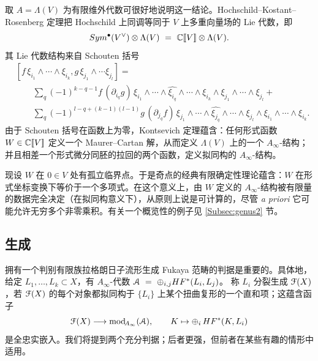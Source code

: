 取 $A = \Lambda(V)$ 为有限维外代数可很好地说明这一结论。Hochschild--Kostant--Rosenberg 定理把 Hochschild 上同调等同于 $V$ 上多重向量场的 Lie 代数，即
\[
Sym^{\bullet}(V^{\vee}) \otimes \Lambda(V) \ = \ \bC[\![V]\!] \otimes \Lambda(V).
\]
其 Lie 代数结构来自 Schouten 括号
\begin{equation}
\begin{aligned} {}
& [f \,\xi_{i_1} \wedge \cdots \wedge \xi_{i_k}, g \,\xi_{j_1} \wedge \cdots \xi_{j_l}] = \\
& \textstyle \qquad \sum_q (-1)^{k-q-1} f \, (\partial_{i_q}g) \,
\xi_{i_1}  \wedge \cdots \wedge \widehat{\xi_{i_q}} \wedge \cdots
\wedge \xi_{i_k} \wedge \xi_{j_1} \wedge \cdots \wedge \xi_{j_l} + \\ & \textstyle \qquad
 \sum_q (-1)^{l-q+ (k-1)(l-1)} g \,(\partial_{j_q}f)\, \xi_{j_1} \wedge \cdots \wedge \widehat{\xi_{j_q}} \wedge \cdots \wedge \xi_{j_l} \wedge \xi_{i_1} \wedge
 \cdots \wedge \xi_{i_k}.
\end{aligned}
\end{equation}
由于 Schouten 括号在函数上为零，Kontsevich 定理蕴含：任何形式函数 $W\in\mathbb{C}[\![V]\!]$ 定义一个 Maurer--Cartan 解，从而定义 $\Lambda(V)$ 上的一个 $A_{\infty}$-结构；并且相差一个形式微分同胚的拉回的两个函数，定义拟同构的 $A_{\infty}$-结构。

现设 $W$ 在 $0\in V$ 处有孤立临界点。于是奇点的经典有限确定性理论蕴含：$W$ 在形式坐标变换下等价于一个多项式。在这个意义上，由 $W$ 定义的 $A_{\infty}$-结构被有限量的数据完全决定（在拟同构意义下），从原则上说是可计算的，尽管 \emph{a priori} 它可能允许无穷多个非零乘积。有关一个概览性的例子见 \ref{Subsec:genus2} 节。

\subsection{生成\label{Sec:Generation}}

拥有一个判别有限族拉格朗日子流形生成 Fukaya 范畴的判据是重要的。具体地，给定 $L_1,\ldots,L_k \subset X$，有 $A_{\infty}$-代数
$\EuScript{A} \ = \ \oplus_{i,j} HF^*(L_i,L_j)$。
称 $L_i$ 分裂生成 $\EuScript{F}(X)$，若 $\EuScript{F}(X)$ 的每个对象都拟同构于 $\{L_i\}$ 上某个扭曲复形的一个直和项；这蕴含函子
\[
\EuScript{F}(X) \longrightarrow  \mathrm{mod}_{\!A_{\infty}}(\EuScript{A}), \qquad K \mapsto \oplus_i \, HF^*(K,L_i)
\]
是全忠实嵌入。我们将提到两个充分判据；后者更强，但前者在某些有趣的情形中适用。

